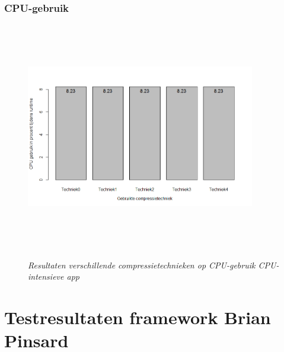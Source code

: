 \subsubsection{CPU-gebruik}
\begin{figure}[H]
	\centering
	\caption{\textit{Resultaten verschillende compressietechnieken op CPU-gebruik CPU-intensieve app}}
	\includegraphics[width=10cm, height=10cm, keepaspectratio]{img/app3cpu}\\[.5cm]
	
\end{figure}

 \section{Testresultaten framework Brian Pinsard}
\label{sec:invloedcompressie}